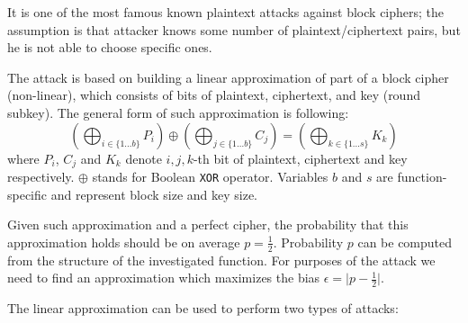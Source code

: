 \documentclass[
    digital,    %
    oneside,    %
    color,
    11pt,
    nocover,
    notable,
    nolof,
    nolot,
    final
]{fithesis3}
\renewcommand\_{\textunderscore\allowbreak}
\begin{document}
It is one of the most famous known plaintext attacks against block ciphers; the assumption is that attacker knows some number of plaintext/ciphertext pairs, but he is not able to choose specific ones. 

The attack is based on building a linear approximation of part of a block cipher (non-linear), which consists of bits of plaintext, ciphertext, and key (round subkey). The general form of such approximation is following: 
\begin{equation}
\left( \bigoplus_{i \in \{1...b\}} P_{i} \right) \oplus \left( \bigoplus_{j \in \{1...b\}} C_{j} \right) = \left( \bigoplus_{k \in \{1...s\}} K_{k} \right)
\label{eq:general_approx}
\end{equation}
where $P_{i}$, $C_{j}$ and $K_{k}$ denote $i,j,k$-th bit of plaintext, ciphertext and key respectively. $\oplus$ stands for Boolean \texttt{XOR} operator. Variables $b$ and $s$ are function-specific and represent block size and key size. \cite{junod2000linear} 

Given such approximation and a perfect cipher, the probability that this approximation holds should be on average $p = \frac{1}{2}$. Probability $p$ can be computed from the structure of the investigated function. For purposes of the attack we need to find an approximation which maximizes the bias $\epsilon = \lvert p - \frac{1}{2} \rvert$. 

The linear approximation can be used to perform two types of attacks:
\end{document}
